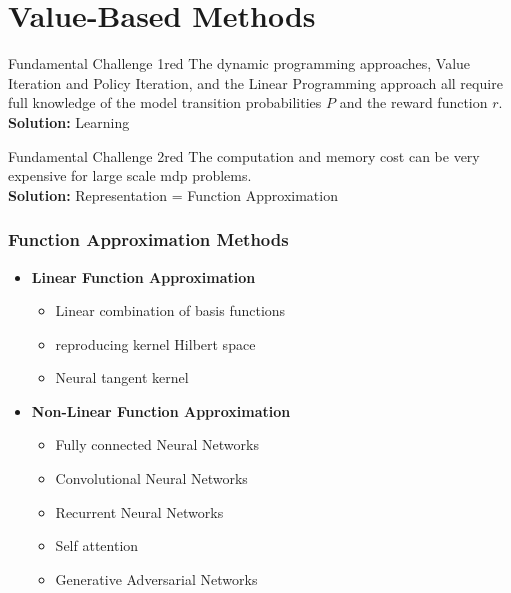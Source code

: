 \chapter{Value-Based Methods}\label{chap:value-based-methods}
 
\begin{mybox}{Fundamental Challenge 1}{red}
The dynamic programming approaches, Value Iteration and Policy Iteration, and the Linear Programming approach all
require full knowledge of the model transition probabilities $P$ and the reward function $r$. \\

\textbf{Solution: } Learning
\end{mybox}

\begin{mybox}{Fundamental Challenge 2}{red}
The computation and memory cost can be very expensive for large scale \gls{mdp} problems. \\
\textbf{Solution: } Representation = Function Approximation
\end{mybox}

\subsection{Function Approximation Methods}
\begin{itemize}
    \item \textbf{Linear Function Approximation}
        \begin{itemize}
            \item Linear combination of basis functions
            \item reproducing kernel Hilbert space
            \item Neural tangent kernel
        \end{itemize}
    \item \textbf{Non-Linear Function Approximation}
        \begin{itemize}
            \item Fully connected Neural Networks
            \item Convolutional Neural Networks
            \item Recurrent Neural Networks
            \item Self attention
            \item Generative Adversarial Networks
        \end{itemize}
\end{itemize}

